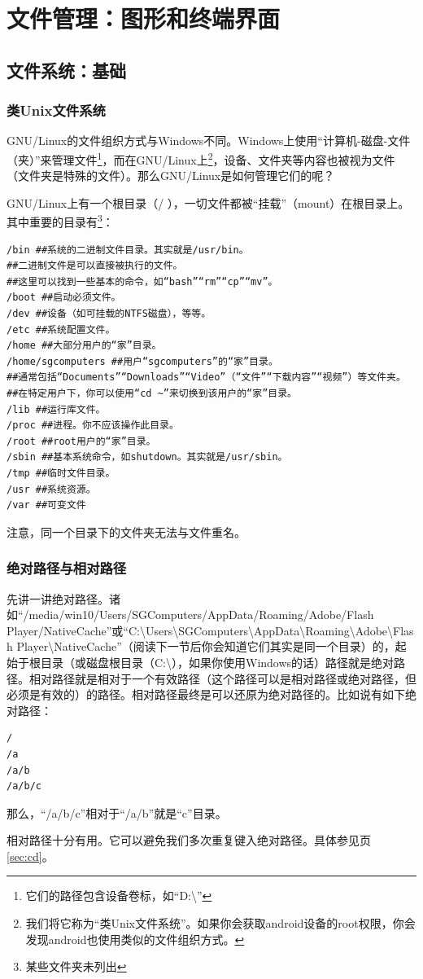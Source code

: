 \documentclass{book}
\begin{document}
\section{文件管理：图形和终端界面}
\subsection{文件系统：基础}
\subsubsection{类Unix文件系统}
GNU/Linux的文件组织方式与Windows不同。Windows上使用“计算机-磁盘-文件（夹）”来管理文件\footnote{它们的路径包含设备卷标，如“D:\textbackslash”}，而在GNU/Linux上\footnote{我们将它称为“类Unix文件系统”。如果你会获取android设备的root权限，你会发现android也使用类似的文件组织方式。}，设备、文件夹等内容也被视为文件（文件夹是特殊的文件）。那么GNU/Linux是如何管理它们的呢？\par
GNU/Linux上有一个根目录（/ ），一切文件都被“挂载”（mount）在根目录上。其中重要的目录有\footnote{某些文件夹未列出}：
\begin{verbatim}
/bin ##系统的二进制文件目录。其实就是/usr/bin。
##二进制文件是可以直接被执行的文件。
##这里可以找到一些基本的命令，如“bash”“rm”“cp”“mv”。
/boot ##启动必须文件。
/dev ##设备（如可挂载的NTFS磁盘），等等。
/etc ##系统配置文件。
/home ##大部分用户的“家”目录。
/home/sgcomputers ##用户“sgcomputers”的“家”目录。
##通常包括“Documents”“Downloads”“Video”（“文件”“下载内容”“视频”）等文件夹。
##在特定用户下，你可以使用“cd ~”来切换到该用户的“家”目录。
/lib ##运行库文件。
/proc ##进程。你不应该操作此目录。
/root ##root用户的“家”目录。
/sbin ##基本系统命令，如shutdown。其实就是/usr/sbin。
/tmp ##临时文件目录。
/usr ##系统资源。
/var ##可变文件
\end{verbatim}
注意，同一个目录下的文件夹无法与文件重名。
\subsubsection{绝对路径与相对路径}
先讲一讲绝对路径。诸如“/media/win10/Users/SGComputers/AppData/Roaming/Adobe/Flash Player/NativeCache”或“C:\textbackslash Users\textbackslash SGComputers\textbackslash AppData\textbackslash Roaming\textbackslash Adobe\textbackslash Flash Player\textbackslash NativeCache”（阅读下一节后你会知道它们其实是同一个目录）的，起始于根目录（或磁盘根目录（C:\textbackslash），如果你使用Windows的话）路径就是绝对路径。相对路径就是相对于一个有效路径（这个路径可以是相对路径或绝对路径，但必须是有效的）的路径。相对路径最终是可以还原为绝对路径的。比如说有如下绝对路径：
\begin{verbatim}
/
/a
/a/b
/a/b/c
\end{verbatim}
那么，“/a/b/c”相对于“/a/b”就是“c”目录。\par
相对路径十分有用。它可以避免我们多次重复键入绝对路径。具体参见\pageref{sec:cd}页\ref{sec:cd}。
\end{document}
